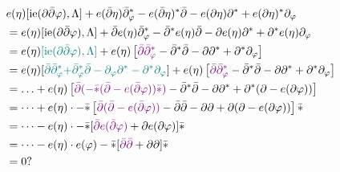 \documentclass[twoside,openany,12pt]{beautynote}
\begin{document}
\begin{align*}
    &e (\eta) [\tmop{ie} (\partial \bar{\partial} \varphi), \Lambda] + e
    (\bar{\partial} \eta) \bar{\partial}^{\ast}_{\varphi} - e (\bar{\partial}
    \eta)^{\ast} \bar{\partial} - e (\partial \eta) \partial^{\ast} + e
    (\partial \eta)^{\ast} \partial_{\varphi} \\
    &= e (\eta) [\tmop{ie} (\partial \bar{\partial} \varphi), \Lambda] +
    \bar{\partial} e (\eta) \bar{\partial}^{\ast}_{\varphi} -
    \bar{\partial}^{\ast} e (\eta)  \bar{\partial} - \partial e (\eta)
    \partial^{\ast} + \partial^{\ast} e (\eta)  \partial_{\varphi} \\
    &= e (\eta) {\color[HTML]{008080}[\tmop{ie} (\partial \bar{\partial}
    \varphi), \Lambda]} + e (\eta) \left[ {\color[HTML]{800080}\bar{\partial}
    \bar{\partial}^{\ast}_{\varphi}} - {\bar{\partial}^{\ast}}  \bar{\partial} -
    \partial \partial^{\ast} + \partial^{\ast} \partial_{\varphi} \right]
    \\
    &= e (\eta) [{\color[HTML]{008080}\bar{\partial}
    \bar{\partial}^{\ast}_{\varphi} +}
    {\color[HTML]{008080}\bar{\partial}^{\ast}_{\varphi} \bar{\partial} -
    \partial_{\varphi} \partial^{\ast} - \partial^{\ast} \partial_{\varphi}}] +
    e (\eta) \left[ {\color[HTML]{800080}\bar{\partial}
    \bar{\partial}^{\ast}_{\varphi}} - {\bar{\partial}^{\ast}}  \bar{\partial} -
    \partial \partial^{\ast} + \partial^{\ast} \partial_{\varphi} \right]
    \\
    &= \ldots + e (\eta) \left[ {\color[HTML]{800080}\bar{\partial} (- \bar{\ast}
    (\bar{\partial} - e (\bar{\partial} \varphi)) \bar{\ast})} -
    {\bar{\partial}^{\ast}}  \bar{\partial} - \partial \partial^{\ast} +
    \partial^{\ast}  (\partial - e (\partial \varphi)) \right] \\
    &= \cdots + e (\eta) \cdot - \bar{\ast} \left[
    {\color[HTML]{800080}\bar{\partial} ( \bar{\partial} - e (\bar{\partial}
    \varphi))} - {\bar{\partial} }  \bar{\partial} - \partial \partial  +
    \partial   (\partial - e (\partial \varphi)) \right] \bar{\ast} \\
    &= \cdots - e (\eta) \cdot - \bar{\ast} [{\color[HTML]{800080}\bar{\partial}
    e (\bar{\partial} \varphi)} + \partial  e (\partial \varphi)] \bar{\ast}  \\
    &= \cdots - e (\eta) \cdot e (\varphi) - \bar{\ast}
    [{\color[HTML]{800080}\bar{\partial} \bar{\partial} } + \partial  \partial]
    \bar{\ast} \\
    &= 0 ? 
  \end{align*}
  
\end{document}
